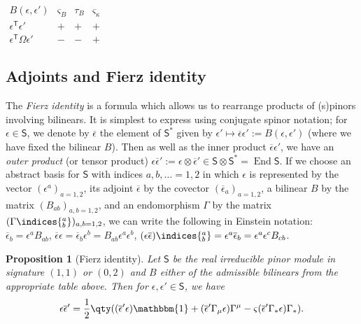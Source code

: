 \documentclass[pdftex]{sigma}
\numberwithin{equation}{section}
\newtheorem{Proposition}[Theorem]{Proposition}
 { \theoremstyle{definition}
\newtheorem{Definition}[Theorem]{Definition}
\newtheorem{Note}[Theorem]{Note}
\newtheorem{Example}[Theorem]{Example}
\newtheorem{Remark}[Theorem]{Remark} }
\newcommand{\ssS}{\mathsf{S}}
\newcommand{\1}{\mathbbm{1}}
\DeclareMathOperator{\End}{End}
\begin{document}
\begin{table}[t]
\centering
	\caption{Properties of admissible bilinears and their Dirac currents in signature $(0,2)$.}
	\label{table:(0,2)-admissible-bilinears}
	\setlength{\extrarowheight}{.75ex}
	$\begin{array}{c|ccc}
		B(\epsilon,\epsilon')	& \varsigma_B	& \tau_B & \varsigma_\kappa	\\
		\hline
		\epsilon^{\mathsf{T}}\epsilon'	& +	& + & +	\\
		\epsilon^{\mathsf{T}}\Omega\epsilon'	& -	& - & +
	\end{array}$
\end{table}

\subsection{Adjoints and Fierz identity}

The \emph{Fierz identity} is a formula which allows us to rearrange products of (s)pinors involving bilinears. It is simplest to express using conjugate spinor notation; for $\epsilon\in \ssS$, we denote by $\overline\epsilon$ the element of $\ssS^*$ given by $\epsilon'\mapsto\overline\epsilon\epsilon':=B(\epsilon,\epsilon')$ (where we have fixed the bilinear $B$). Then as well as the inner product $\overline\epsilon\epsilon'$, we have an \emph{outer product} (or tensor product) $\epsilon\overline\epsilon':=\epsilon\otimes\overline\epsilon'\in \ssS\otimes \ssS^*=\End \ssS$. If we choose an abstract basis for $\ssS$ with indices $a,b,\ldots=1,2$ in which $\epsilon$ is represented by the vector $(\epsilon^a)_{a=1,2}$, its adjoint $\overline\epsilon$ by the covector $(\overline\epsilon_a)_{a=1,2}$, a bilinear $B$ by the matrix $(B_{ab})_{a,b=1,2}$, and an endomorphism $\Gamma$ by the matrix $(\Gamma\indices{^a_b})_{a,b=1,2}$, we can write the following in Einstein notation:
$
	\overline{\epsilon}_b = \epsilon^a B_{ab}$,
	$\overline{\epsilon}\epsilon = \overline{\epsilon}_b\epsilon^b = B_{ab}\epsilon^a\epsilon^b$,
	$(\epsilon\overline{\epsilon})\indices{^a_b} = \epsilon^a\overline{\epsilon}_b = \epsilon^a \epsilon^c B_{cb}$.

\begin{Proposition}[Fierz identity] \label{prop:2d-fierz}
	Let $\ssS$ be the real irreducible pinor module in signature $(1,1)$ or $(0,2)$ and $B$ either of the admissible bilinears from the appropriate table above. Then for $\epsilon,\epsilon'\in \ssS$, we have
\[
		\epsilon\overline\epsilon' = \frac{1}{2}\qty((\overline\epsilon'\epsilon)\1 + (\overline\epsilon'\Gamma_\mu\epsilon)\Gamma^\mu - \varsigma(\overline\epsilon'\Gamma_*\epsilon)\Gamma_*).
\]
\end{Proposition}
\end{document}

